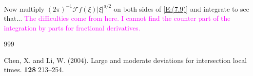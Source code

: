 \documentclass[a4paper,12pt]{article} %
\theoremstyle{plain}
\theoremstyle{definition}
\begin{document}
Now multiply $(2\pi)^{-1}\mathcal{F}f(\xi)|\xi|^{a/2}$ on both sides of \eqref{E:(7.9)} and
integrate to see that... \textcolor{magenta}{The difficulties come from here. I cannot find the
counter part of the integration by parts for fractional derivatives.}


\begin{thebibliography}{999}

	Chen, X. and Li, W. (2004).
	\newblock Large and moderate deviations for intersection local times.
	 {\bf 128} 213--254.

\end{thebibliography} %
\end{document}
